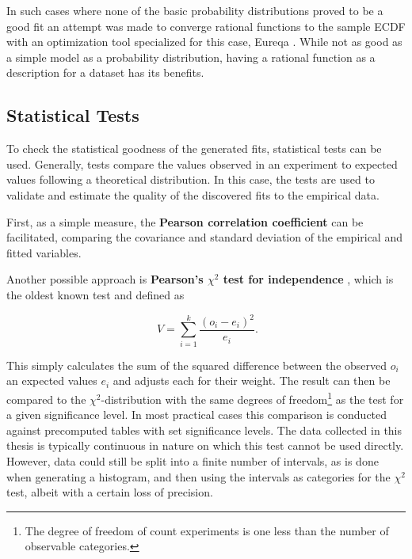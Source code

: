 In such cases where none of the basic probability distributions proved to be a good fit an attempt was made to converge rational functions to the sample \gls{ECDF} with an optimization tool specialized for this case, Eureqa \cite{eureqa_software, eureqa_paper}. While not as good as a simple model as a probability distribution, having a rational function as a description for a dataset has its benefits.






\subsection{Statistical Tests}

To check the statistical goodness of the generated fits, statistical tests can be used. Generally, tests compare the values observed in an experiment to expected values following a theoretical distribution. In this case, the tests are used to validate and estimate the quality of the discovered fits to the empirical data.

First, as a simple measure, the \textbf{Pearson correlation coefficient} can be facilitated, comparing the covariance and standard deviation of the empirical and fitted variables.

Another possible approach is \textbf{Pearson's $\chi^2$ test for independence} \cite{doi:10.1080/14786440009463897}, which is the oldest known test and defined as

\begin{equation}
\phantom{.}V=\sum_{i=1}^{k} \frac{(o_i - e_i)^2}{e_i}\text{.}
\end{equation}

This simply calculates the sum of the squared difference between the observed $o_i$ an expected values $e_i$ and adjusts each for their weight. The result can then be compared to the $\chi^2$-distribution with the same degrees of freedom\footnote{The degree of freedom of count experiments is one less than the number of observable categories.} as the test for a given significance level. In most practical cases this comparison is conducted against precomputed tables with set significance levels. The data collected in this thesis is typically continuous in nature on which this test cannot be used directly. However, data could still be split into a finite number of intervals, as is done when generating a histogram, and then using the intervals as categories for the $\chi^2$ test, albeit with a certain loss of precision.

